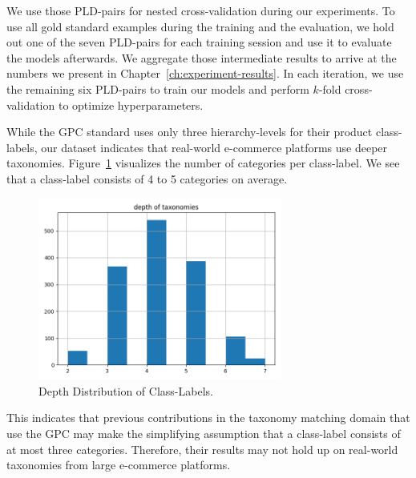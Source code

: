 We use those PLD-pairs for nested cross-validation during our experiments.
To use all gold standard examples during the training and the evaluation, we hold out one of the seven PLD-pairs
for each training session and use it to evaluate the models afterwards.
We aggregate those intermediate results to arrive at the numbers we present in Chapter~\ref{ch:experiment-results}.
In each iteration, we use the remaining six PLD-pairs to train our models and perform $k$-fold cross-validation
to optimize hyperparameters.

While the GPC standard uses only three hierarchy-levels for their product class-labels, our dataset indicates that
real-world e-commerce platforms use deeper taxonomies.
Figure~\ref{fig:depth-distribution} visualizes the number of categories per class-label.
We see that a class-label consists of 4 to 5 categories on average.
\begin{figure}[!htbp]
	\centering
	\includegraphics[width=8cm]{images/depth-distribution.png}
	\caption{Depth Distribution of Class-Labels.}
	\label{fig:depth-distribution}
\end{figure}
This indicates that previous contributions in the taxonomy matching domain that use the GPC may make the simplifying
assumption that a class-label consists of at most three categories.
Therefore, their results may not hold up on real-world taxonomies from large e-commerce platforms.

